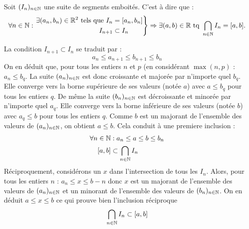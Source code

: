 \begin{thmn}
 Soit $(I_n)_{n\in \mathbb{N}}$ une suite de segments emboités. C'est à dire que :
\[
 \forall n \in \mathbb{N} : 
\left. 
\begin{aligned}
  \exists(a_n,b_n)\in \mathbb{R}^2 \text{ tels que } I_n& = [a_n,b_n] \\
  I_{n+1} &\subset I_n
\end{aligned}
\right\rbrace \Rightarrow 
\exists (a,b)\in \mathbb{R} \text{ tq } \bigcap_{n\in \mathbb{N}}I_n = [a,b].
\]
\end{thmn}
\begin{demo}
 La condition $I_{n+1}\subset I_n$ se traduit par :
\begin{displaymath}
 a_{n} \leq a_{n+1} \leq b_{n+1} \leq b_n
\end{displaymath}
On en déduit que, pour tous les entiers $n$ et $p$ (en considérant $\max(n,p)$ : $a_n \leq b_q$.\newline
La suite $(a_n)_{n\in\mathbb{N}}$ est donc croissante et majorée par n'importe quel $b_q$. Elle converge vers la borne supérieure de ses valeurs (notée $a$) avec $a\leq b_q$ pour tous les entiers $q$.\newline
De même la suite $(b_n)_{n\in\mathbb{N}}$ est décroissante et minorée par n'importe quel $a_q$. Elle converge vers la borne inférieure de ses valeurs (notée $b$) avec $a_q\leq b$ pour tous les entiers $q$.\newline
Comme $b$ est un majorant de l'ensemble des valeurs de $ (a_n)_{n\in\mathbb{N}}$, on obtient $a\leq b$. Cela conduit à une premiere inclusion :
\begin{align*}
 \forall n\in \mathbb{N} &: a_n \leq a \leq b \leq b_n \\
 [a,b]  &\subset \bigcap_{n\in \mathbb{N}}I_n 
\end{align*}
Réciproquement, considérons un $x$ dans l'intersection de tous les $I_n$. Alors, pour tous les entiers $n$ : $a_n\leq x \leq b-n$ donc $x$ est un majorant de l'ensemble des valeurs de $(a_n)_{n\in\mathbb{N}}$ et un minorant de l'ensemble des valeurs de $(b_n)_{n\in\mathbb{N}}$. On en déduit $a\leq x \leq b$ ce qui prouve bien l'inclusion réciproque
\begin{displaymath}
 \bigcap_{n\in \mathbb{N}}I_n  \subset [a,b]
\end{displaymath}
\end{demo}

